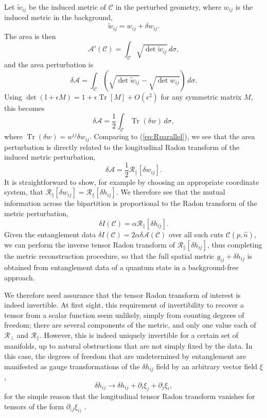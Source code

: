 \documentclass[%
12pt,preprint,
nofootinbib,
amsmath,amssymb,
aps,
prd,
showpacs,
superscriptaddress
]{revtex4-2}
\DeclareMathOperator{\Tr}{Tr}
\newcommand{\R}{\mathscr{R}}
\newcommand{\area}{\mathcal{A}}
\begin{document}
Let $\tilde{w}_{ij}$ be the induced metric of $\mathcal{C}$ in the perturbed geometry, where $w_{ij}$ is the induced metric in the background,
\begin{equation}
  \tilde{w}_{ij} = w_{ij} + \delta w_{ij}.
\end{equation}
The area is then
\begin{equation}
  \area'(\mathcal{C}) = \int_\mathcal{C} \sqrt{\det{\tilde{w}_{ij}}}\, d\sigma,
\end{equation}
and the area perturbation is 
\begin{equation}
  \delta \area = \int_\mathcal{C} \left(\sqrt{\det{\tilde{w}_{ij}}}-\sqrt{\det{{w}_{ij}}}\right)\, d\sigma.
\end{equation}
Using $\det(\mathbb{I}+\epsilon M)=1+\epsilon\Tr[M]+O(\epsilon^2)$ for any symmetric matrix $M$, this becomes
\begin{equation}
  \delta \area = \frac 1 2 \int_\mathcal{C} \Tr (\delta w) \, d\sigma,
\end{equation}
where $\Tr (\delta w) = w^{ij}\delta w_{ij}$.
Comparing to (\ref{eq:Rparallel}), we see that the area perturbation is directly related to the longitudinal Radon transform of the induced metric perturbation,
\begin{equation}
  \delta \area = \frac 1 2\R_\parallel [\delta w_{ij}].
\end{equation}
It is straightforward to show, for example by choosing an appropriate coordinate system, that $\R_{\parallel}[\delta w_{ij}] =\R_{\parallel}[\delta h_{ij}] $.
We therefore see that the mutual information across the bipartition is proportional to the Radon transform of the metric perturbation,
\begin{equation}
\delta I(\mathcal{C})= \alpha \R_{\parallel}[\delta h_{ij}] .
\end{equation}
Given the entanglement data $\delta I(\mathcal{C}) =2\alpha \delta \area(\mathcal{C})$ over all such cuts $\mathcal{C}(p,\hat{n})$, we can perform the inverse tensor Radon transform of $ \R_{\parallel}[\delta h_{ij}]$, thus completing the metric reconstruction procedure, so that the full spatial metric $g_{ij}+\delta h_{ij}$ is obtained from entanglement data of a quantum state in a background-free approach. 

We therefore need assurance that the tensor Radon transform of interest is indeed invertible.
At first sight, this requirement of invertibility to recover a tensor from a scalar function seem unlikely, simply from counting degrees of freedom; there are several components of the metric, and only one value each of $\R_\bot$ and $\R_\parallel$. 
However, this is indeed uniquely invertible for a certain set of manifolds, up to natural obstructions that are not simply fixed by the data. In this case, the degrees of freedom that are undetermined by entanglement are manifested as gauge transformations of the $\delta h_{ij}$ field by an arbitrary vector field $\xi$,
\begin{equation}
\delta h_{ij} \rightarrow \delta h_{ij} +\partial_i \xi_j +\partial_j\xi_i,
\end{equation}
for the simple reason that the longitudinal tensor Radon transform vanishes for tensors of the form $\partial_{(j}\xi_{i)}$ .
\end{document}
